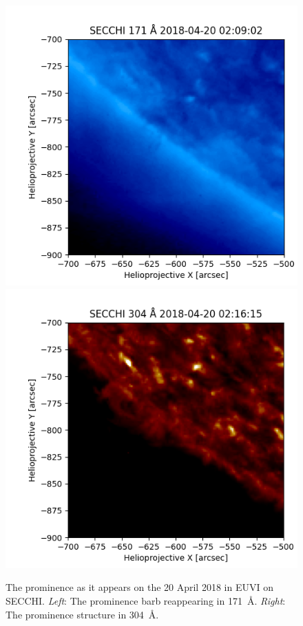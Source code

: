 \begin{figure}
    \centering
    \includegraphics[width=0.49\linewidth]{./01Observations/figs/20180419/secchi171.png}
    \includegraphics[width=0.49\linewidth]{./01Observations/figs/20180419/secchi304.png}
    \caption[The prominence as it appears on the 20 April 2018 in EUVI on SECCHI.]{The prominence as it appears on the 20 April 2018 in EUVI on SECCHI. \textit{Left}: The prominence barb reappearing in 171~\AA. \textit{Right}: The prominence structure in 304~\AA.}
    \label{secchi}
\end{figure}

